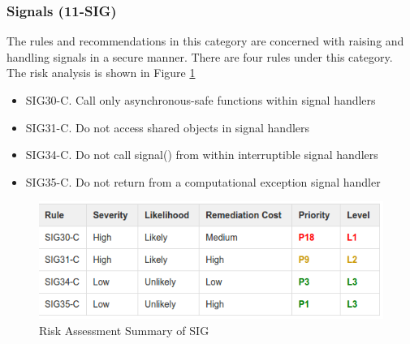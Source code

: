 \subsubsection{Signals (11-SIG)} The rules and recommendations in this category are concerned with raising and handling signals in a secure manner. There are four rules under this category. The risk analysis is shown in Figure \ref{fig:12}\cite{cert-c}
	\begin{itemize}
		\item SIG30-C. Call only asynchronous-safe functions within signal handlers
		
		\item SIG31-C. Do not access shared objects in signal handlers
		
		\item SIG34-C. Do not call signal() from within interruptible signal handlers
		
		\item SIG35-C. Do not return from a computational exception signal handler
	\end{itemize}
	\begin{figure}[H]
		
		
		\centering
		\includegraphics[width=.6\linewidth]{Figures/sig}
		\caption{Risk Assessment Summary of SIG}
		\label{fig:12}
		
	\end{figure}
